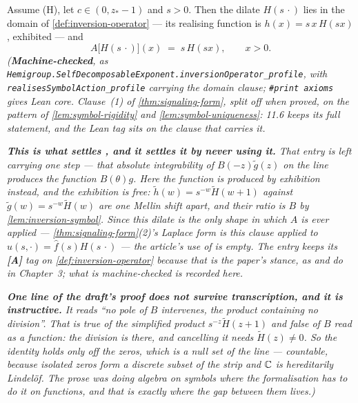 \begin{lemma}\label{lem:profile-eigenfunction}
\leanok
Assume (H), let $c \in (0, z_*-1)$ and $s > 0$. Then the dilate $H(s\,\cdot)$ lies in the domain of
\ref{def:inversion-operator} --- its realising function is $h(x) = s\,x\,H(sx)$, exhibited --- and
\[
  A\bigl[H(s\,\cdot)\bigr](x) \;=\; s\,H(sx), \qquad x > 0 .
\]
\statusT\quad\emph{(\textbf{Machine-checked}, as
\texttt{Hemigroup.SelfDecomposableExponent.inversionOperator\_profile}, with
\texttt{realisesSymbolAction\_profile} carrying the domain clause;
\texttt{\#print axioms} gives Lean core. Clause~(1) of
\ref{thm:signaling-form}, split off when proved, on the pattern of \ref{lem:symbol-rigidity}
and \ref{lem:symbol-uniqueness}: 11.6 keeps its full statement, and the Lean tag sits on the
clause that carries it.}

\emph{\textbf{This is what settles , and it settles it by never using it.} That entry is
left carrying one step --- that absolute integrability of $B(-z)\tilde g(z)$ on the line \emph{produces}
the function $B(\theta)g$. Here the function is produced by exhibition instead, and the exhibition is
free: $\tilde h(w) = s^{-w}\tilde H(w+1)$ against $\tilde g(w) = s^{-w}\tilde H(w)$ are one Mellin shift
apart, and their ratio is $B$ by \ref{lem:inversion-symbol}. Since this dilate is the \emph{only}
shape in which $A$ is ever applied --- \ref{thm:signaling-form}(2)'s Laplace form is this clause
applied to $\hat u(s,\cdot) = \hat f(s)H(s\,\cdot)$ --- the article's use of  is empty. The
entry keeps its \textbf{[A]} tag on \ref{def:inversion-operator} because that is the \emph{paper's}
stance, as  and  do in Chapter~3; what is machine-checked is recorded here.}

\emph{\textbf{One line of the draft's proof does not survive transcription, and it is instructive.}
It reads ``no pole of $B$ intervenes, the product containing no division''. That is true of the
\emph{simplified} product $s^{-z}\tilde H(z+1)$ and false of $B$ read as a function: the division is
there, and cancelling it needs $\tilde H(z) \ne 0$. So the identity holds only off the zeros, which
is a null set of the line --- countable, because isolated zeros form a discrete subset of the
strip and $\mathbb{C}$ is hereditarily Lindel\"of. The prose was doing algebra on symbols where the
formalisation has to do it on functions, and that is exactly where the gap between them lives.)}
\end{lemma}

